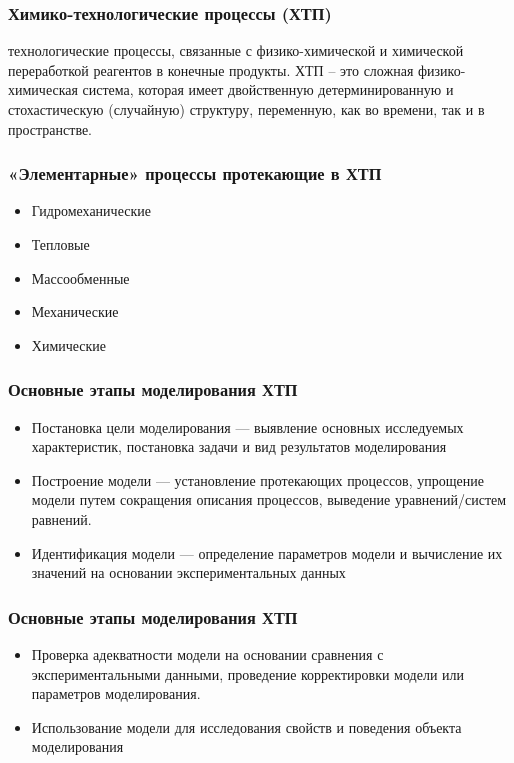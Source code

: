 \begin{frame}
	\frametitle{Химико-технологические процессы (ХТП)}
	технологические процессы, связанные с физико-химической и химической переработкой реагентов в конечные продукты. ХТП – это сложная физико-химическая система, которая имеет двойственную детерминированную и стохастическую (случайную) структуру, переменную, как во времени, так и в пространстве.
\end{frame}

\begin{frame}
	\frametitle{«Элементарные» процессы протекающие в ХТП}
\begin{itemize}
	\item Гидромеханические
	\item Тепловые
	\item Массообменные
	\item Механические
	\item Химические
\end{itemize}
\end{frame}

\begin{frame}
\frametitle{Основные этапы моделирования ХТП}
	\begin{itemize}
	\item Постановка цели моделирования --- выявление основных исследуемых характеристик, постановка задачи и вид результатов моделирования
	\item Построение модели --- установление протекающих процессов, упрощение модели путем сокращения описания процессов, выведение уравнений/систем равнений.
	\item Идентификация модели --- определение параметров модели и вычисление их значений на основании экспериментальных данных
\end{itemize}
\end{frame}

\begin{frame}
	\frametitle{Основные этапы моделирования ХТП}
	\begin{itemize}
		\item Проверка адекватности модели на основании сравнения с экспериментальными данными, проведение корректировки модели или параметров моделирования.
		\item Использование модели для исследования свойств и поведения объекта моделирования
	\end{itemize}
\end{frame}

